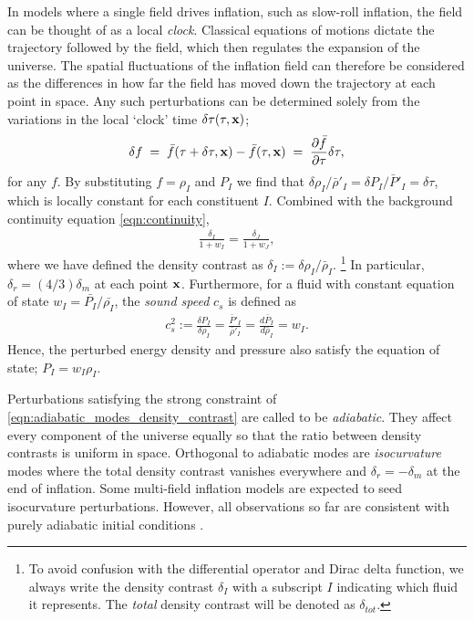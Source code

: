 In models where a single field drives inflation, such as slow-roll inflation, the field can be thought of as a local \textit{clock}. Classical equations of motions dictate the trajectory followed by the field, which then regulates the expansion of the universe. The spatial fluctuations of the inflation field can therefore be considered as the differences in how far the field has moved down the trajectory at each point in space. Any such perturbations can be determined solely from the variations in the local `clock' time $\delta\tau(\tau,\mathbf{x})$;
\begin{align}
	\delta f \;=\; \bar{f}(\tau + \delta\tau, \mathbf{x}) - \bar{f}(\tau,\mathbf{x}) \;=\; \frac{\partial\bar{f}}{\partial\tau} \delta\tau, \label{eqn:local_clock_time_fluctuation}
\end{align}
for any $f$. By substituting $f=\rho_I$ and $P_I$ we find that $\delta\rho_I/\bar{\rho}'_I = \delta P_I / \bar{P}'_I = \delta\tau$, which is locally constant for each constituent $I$. Combined with the background continuity equation \eqref{eqn:continuity},
\begin{align}
	\frac{\delta_I}{1+w_I} = \frac{\delta_J}{1+w_J}, \label{eqn:adiabatic_modes_density_contrast}
\end{align}
where we have defined the density contrast as $\delta_I := \delta\rho_I / \bar{\rho}_I$. \footnote{To avoid confusion with the differential operator and Dirac delta function, we always write the density contrast $\delta_I$ with a subscript $I$ indicating which fluid it represents. The \textit{total} density contrast will be denoted as $\delta_{tot}$.} In particular, $\delta_r = (4/3) \delta_m$ at each point $\mathbf{x}$. Furthermore, for a fluid with constant equation of state $w_I = \bar{P_I} / \bar{\rho_I}$, the \textit{sound speed} $c_s$ is defined as
\begin{align}
	c_s^2 := \frac{\delta P_I}{\delta\rho_I} = \frac{\bar{P}'_I}{\bar{\rho}'_I} = \frac{d\bar{P}_I}{d\bar{\rho}_I} = w_I. \label{eqn:adiabatic_modes_sound_speed}
\end{align}
Hence, the perturbed energy density and pressure also satisfy the equation of state; $P_I = w_I \rho_I$.

Perturbations satisfying the strong constraint of \eqref{eqn:adiabatic_modes_density_contrast} are called to be \textit{adiabatic}. They affect every component of the universe equally so that the ratio between density contrasts is uniform in space. Orthogonal to adiabatic modes are \textit{isocurvature} modes where the total density contrast vanishes everywhere and $\delta_r = -\delta_m$ at the end of inflation. Some multi-field inflation models are expected to seed isocurvature perturbations. However, all observations so far are consistent with purely adiabatic initial conditions \cite{Kogut2003wmapAdiabatic, PlanckCollaboration2018inflation}.


